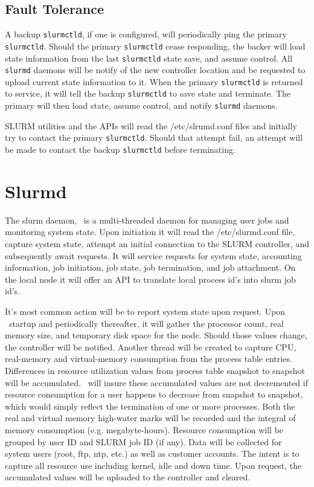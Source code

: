 \subsection{Fault Tolerance}

A backup {\tt slurmctld}, if one is configured, will periodically ping
the primary {\tt slurmctld}.  Should the primary {\tt slurmctld} cease
responding, the backer will load state information from the last 
{\tt slurmctld} state save, and assume control.  All {\tt slurmd} daemons
will be notify of the new controller location and be requested to upload
current state information to it.  When the primary {\tt slurmctld} is
returned to service, it will tell the backup {\tt slurmctld} to save
state and terminate.  The primary will then load state, assume control,
and notify {\tt slurmd} daemons.

SLURM utilities and the APIs will read the /etc/slrumd.conf files 
and initially try to contact the primary {\tt slurmctld}. 
Should that attempt fail, an attempt will be made to contact the 
backup {\tt slurmctld} before terminating.

\section{Slurmd}

The slurm daemon, \slurmd\, is a multi-threaded daemon for managing
user jobs and monitoring system state.  Upon initiation it will read
the /etc/slurmd.conf file, capture system state, attempt an initial
connection to the SLURM controller, and subsequently await requests.
It will service requests for system state, accounting information,
job initiation, job state, job termination, and job attachment. On the
local node it will offer an API to translate local process id's into
slurm job id's. 

It's most common action will be to report system state upon request. Upon
\slurmd\ startup and periodically thereafter, it will gather the processor
count, real memory size, and temporary disk space for the node. Should
those values change, the controller will be notified.  Another thread will
be created to capture CPU, real-memory and virtual-memory consumption from
the process table entries.  Differences in resource utilization values
from process table snapshot to snapshot will be accumulated. \slurmd\ 
will insure these accumulated values are not decremented if resource
consumption for a user happens to decrease from snapshot to snapshot,
which would simply reflect the termination of one or more processes.
Both the real and virtual memory high-water marks will be recorded and
the integral of memory consumption (e.g. megabyte-hours).  Resource
consumption will be grouped by user ID and SLURM job ID (if any). Data
will be collected for system users (root, ftp, ntp, etc.) as well as
customer accounts. The intent is to capture all resource use including
kernel, idle and down time.  Upon request, the accumulated values will be
uploaded to the controller and cleared.  

